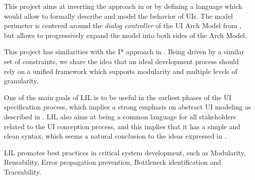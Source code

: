 \documentclass{sigchi}
\begin{document}
This project  aims at inverting the approach  in \cite{ausbourg98} or \cite{Cortier2008}  by  defining  a  language  which  would  allow  to formally describe and  model the behavior  of UIs.  The model perimeter is centered around the \emph{dialog controller} of the UI Arch Model from \cite{Bass91}, but allows to progressively expand the model into both sides of the Arch Model. 

This project has similarities with the I* approach in \cite{chatty-sc-2008}. Being driven by a similar set of constraints, we share the idea that an ideal development process should rely on a unified framework which supports modularity and multiple levels of granularity. 

One of the main goals of LIL is to be useful in the earliest phases of the UI specification process, which implies a strong emphasis on abstract UI modeling as described in 
\cite{Paterno:2009:MUD:1614390.1614394}. LIL also aims at being a common language for all stakeholders related to the UI conception process, and this implies that it has a simple and clean syntax, which seems a natural conclusion to the ideas expressed in \cite{chatty2007}.

LIL promotes best practices in critical system development,
such as Modularity, Reusability, Error propagation prevention, Bottleneck identification and Traceability.
\end{document}
